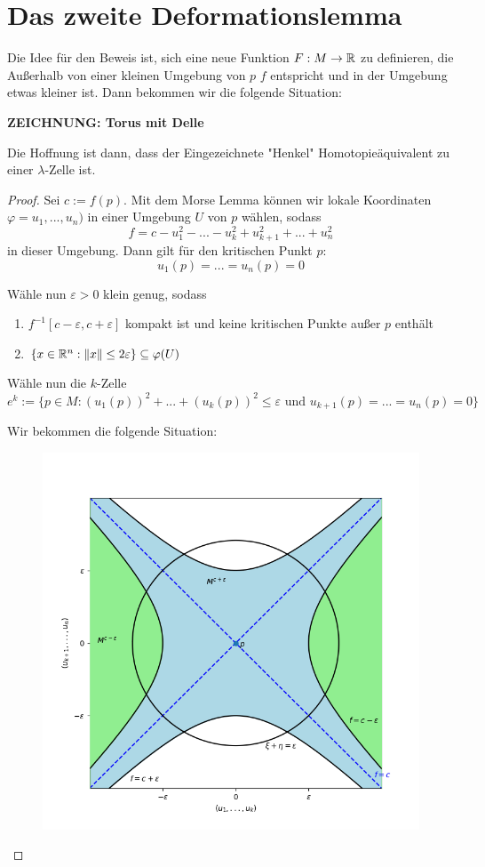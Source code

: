 \documentclass[a4paper,11pt]{article}
\begin{document}
\section{Das zweite Deformationslemma}

Die Idee für den Beweis ist, sich eine neue Funktion $F: M \to { \mathbb R }$ zu definieren,
die Außerhalb von einer kleinen Umgebung von $p$ $f$ entspricht und in der 
Umgebung etwas kleiner ist. Dann bekommen wir die folgende Situation:

\textbf{ZEICHNUNG: Torus mit Delle}

Die Hoffnung ist dann, dass der Eingezeichnete "Henkel" Homotopieäquivalent zu
einer $\lambda$-Zelle ist.

\begin{proof}

    Sei $c := f(p)$. Mit dem Morse Lemma können wir lokale Koordinaten 
    $\varphi = u_1, ..., u_n)$ in einer Umgebung $U$ von $p$ wählen, sodass
    \[ f = c - u_1^2 - ... - u_k^2 + u_{k+1}^2 + ... + u_n^2 \]
    in dieser Umgebung. Dann gilt für den kritischen Punkt $p$:
    \[ u_1(p) = ... = u_n(p) = 0 \]

    Wähle nun $\varepsilon > 0$ klein genug, sodass 
    \begin{enumerate}
        \item $f^{-1}[c - \varepsilon, c + \varepsilon]$ kompakt ist und keine
            kritischen Punkte außer $p$ enthält
        \item $\{ x \in { \mathbb R }^n: \lVert x \rVert \leq 2 \varepsilon \} \subseteq \varphi(U) $
    \end{enumerate}

    Wähle nun die $k$-Zelle 
    \[ 
        e^k := \{ p \in M: (u_1(p))^2 + ... + (u_k(p))^2 \leq \varepsilon 
        \text{ und } u_{k+1}(p) = ... = u_n(p) = 0 \} 
    \]

    Wir bekommen die folgende Situation:

    \begin{figure}[H]
        \centering
        \includegraphics[width=0.8\linewidth]{resources/Me-Diagram6-parametrisierung-sattelpunkt.png}
        \label{fig:me-diagram6}
    \end{figure}


\end{proof}
\end{document}
